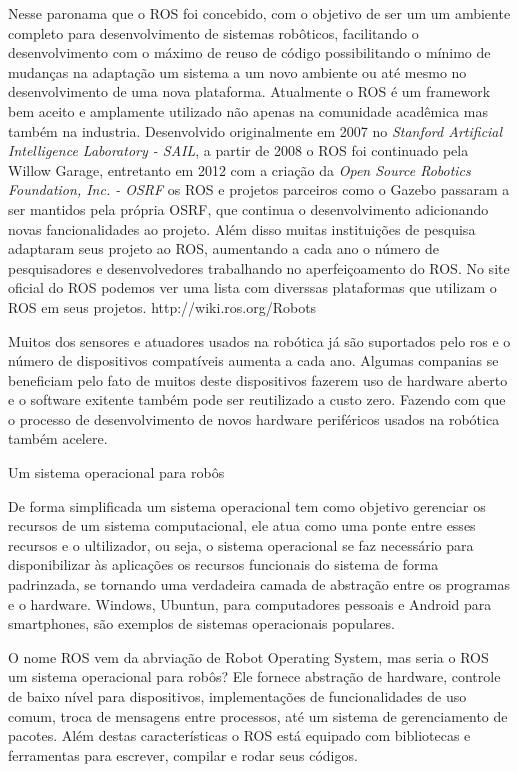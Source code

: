 Nesse paronama que o ROS foi concebido, com o objetivo de  ser um um ambiente completo para desenvolvimento de sistemas robôticos, facilitando o desenvolvimento com o máximo de reuso de código possibilitando o mínimo de mudanças na adaptação um sistema a um novo ambiente ou até mesmo no desenvolvimento de uma nova plataforma. Atualmente o ROS é um framework bem aceito e amplamente utilizado não apenas na comunidade acadêmica mas também na industria. Desenvolvido originalmente em 2007 no \textit{Stanford Artificial Intelligence Laboratory - SAIL}, a partir de 2008 o ROS foi continuado pela Willow Garage, entretanto em 2012 com a criação da \textit{Open Source Robotics Foundation, Inc. - OSRF} os ROS e projetos parceiros como o Gazebo passaram a ser mantidos pela própria OSRF, que continua o desenvolvimento adicionando novas fancionalidades ao projeto. Além disso muitas instituições de pesquisa adaptaram seus projeto ao ROS, aumentando a cada ano o número de pesquisadores e desenvolvedores trabalhando no aperfeiçoamento do ROS. No site oficial do ROS podemos ver uma lista com diverssas plataformas que utilizam o ROS em seus projetos. http://wiki.ros.org/Robots

Muitos dos sensores e atuadores usados na robótica já são suportados pelo ros e o número de dispositivos compatíveis aumenta a cada ano. Algumas companias se beneficiam pelo fato de muitos deste dispositivos fazerem uso de hardware aberto e o software exitente também pode ser reutilizado a custo zero. Fazendo com que o processo de desenvolvimento de novos hardware periféricos usados na robótica também acelere.




Um sistema operacional para robôs

De forma simplificada um sistema operacional tem como objetivo gerenciar os recursos de um sistema computacional, ele atua como uma ponte entre esses recursos e o ultilizador, ou seja, o sistema operacional se faz necessário para disponibilizar às aplicações os recursos 
funcionais do sistema de forma padrinzada, se tornando uma verdadeira camada de abstração entre os programas e o hardware. Windows, Ubuntun, para computadores pessoais e Android para smartphones, são exemplos de sistemas operacionais populares.

O nome ROS vem da abrviação de Robot Operating System, mas seria o ROS um sistema operacional para robôs? Ele fornece abstração de hardware, controle de baixo nível para dispositivos, implementações de funcionalidades de uso comum, troca de mensagens entre processos, até um sistema de gerenciamento de pacotes. Além destas características o ROS está equipado com bibliotecas e ferramentas para escrever, compilar e rodar seus códigos. %

